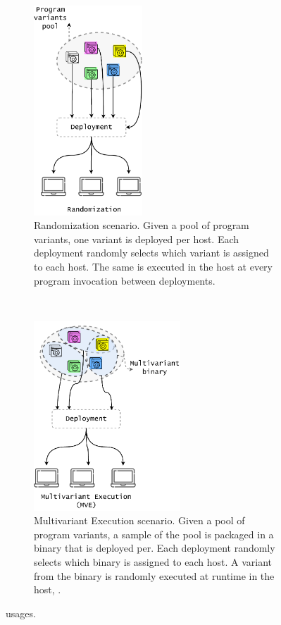 \newcommand{\rulesep}{\unskip\ \vrule\ }
\begin{figure}[h]
    \centering
    \begin{subfigure}[t]{0.45\textwidth}
        \centering
        \includegraphics[height=3.1in]{diagrams/randomization.pdf}
        \vspace{0.5cm}
        \caption{Randomization scenario. Given a pool of program variants, one variant is deployed per host. Each deployment randomly selects which variant is assigned to each host. The same is executed in the host at every program invocation between deployments. }        \label{diagrams:sota:randomization}

    \end{subfigure}
    \hspace{1.5mm}
    \rulesep
    \hspace{1.5mm}
    \begin{subfigure}[t]{0.45\textwidth}
        \centering
        \includegraphics[height=2.8in]{diagrams/mve.pdf}
        \caption{Multivariant Execution scenario. Given a pool of program variants, a sample of the pool is packaged in a binary that is deployed per. Each deployment randomly selects which binary is assigned to each host. A variant from the binary is randomly executed at runtime in the host, .}        \label{diagrams:sota:mve}

    \end{subfigure}
    \caption{usages. }
\end{figure}

